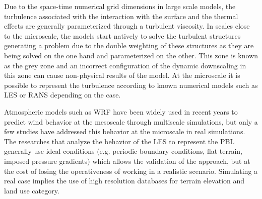 Due to the space-time numerical grid dimensions in large scale models, the turbulence associated with the interaction with the surface and the thermal effects are generally parameterized through a turbulent viscosity. In scales close to the microscale, the models start natively to solve the turbulent structures generating a problem due to the double weighting of these structures as they are being solved on the one hand and parameterized on the other. This zone is known as the grey zone \citep{Wyngaard2004} and an incorrect configuration of the dynamic downscaling in this zone can cause non-physical results of the model. At the microscale it is possible to represent the turbulence according to known numerical models such as LES or RANS depending on the case.

Atmospheric models such as WRF have been widely used in recent years to predict wind behavior at the mesoscale through multiscale simulations, but only a few studies have addressed this behavior at the microscale in real simulations. The researches that analyze the behavior of the LES to represent the PBL generally use ideal conditions (e.g. periodic boundary conditions, flat terrain, imposed pressure gradients) which allows the validation of the approach, but at the cost of losing the operativeness of working in a realistic scenario. Simulating a real case implies the use of high resolution databases for terrain elevation and land use category.

